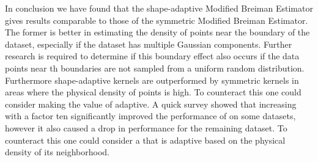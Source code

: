 
In conclusion we have found that the shape-adaptive Modified Breiman Estimator gives results comparable to those of the symmetric Modified Breiman Estimator. 
The former is better in estimating the density of points near the boundary of the dataset, especially if the dataset has multiple Gaussian components. Further research is required to determine if this boundary effect also occurs if the data points near th boundaries are not sampled from a uniform random distribution. 
Furthermore shape-adaptive kernels are outperformed by symmetric kernels in areas where the physical density of points is high. To counteract this one could consider making the value of \KNNK adaptive. A quick survey showed that increasing \KNNK with a factor ten significantly improved the performance of \sambe on some datasets, however it also caused a drop in performance for the remaining dataset. To counteract this one could consider a \KNNK that is adaptive based on the physical density of its neighborhood. 